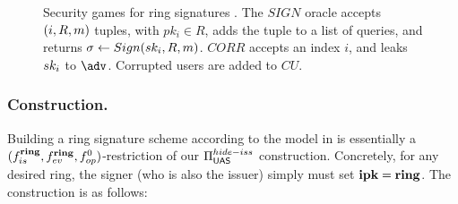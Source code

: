 \begin{figure}[ht!]
  \centering
  \caption{Security games for ring signatures \cite{bkm06}. The $SIGN$ oracle
    accepts $(i,R,m)$ tuples, with $pk_i \in R$, adds the tuple to a list of
    queries, and returns $\sigma \gets Sign(sk_i,R,m)$. $CORR$
    accepts an index $i$, and leaks $sk_i$ to $\adv$. Corrupted users are added
    to $CU$.}
  \label{fig:model-rs}  
\end{figure}


\subsubsection{\CUASRing Construction.} %
Building a ring signature scheme according to the model in 
is essentially a $(f_{is}^{\mathbf{ring}},f_{ev}^{\mathbf{ring}},f_{op}^0)$-restriction of
our $\Pi_{\mathsf{UAS}}^{hide-iss}$ construction. Concretely, for any desired ring, the
signer (who is also the issuer) simply must set $\mathbf{ipk}=\mathbf{ring}$. The construction
is as follows:

